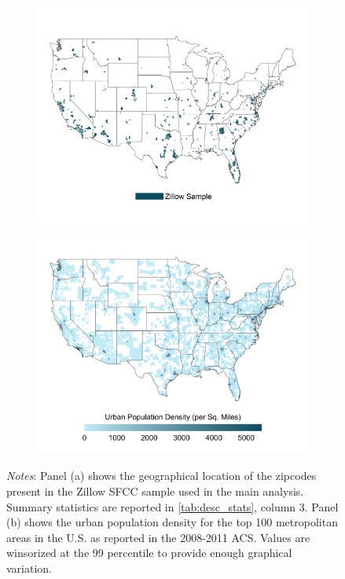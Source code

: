 \begin{figure}
	\caption{Comparison Between Zillow Sample and Population Density in CBSAs}
	\label{fig:maps}
	\begin{subfigure}[b]{\textwidth}\centering
		\includegraphics[width = .85\textwidth]{../../analysis/descriptive_maps/output/sample_map.png}
	\end{subfigure}
	\quad 
	\begin{subfigure}[b]{\textwidth}\centering
		\includegraphics[width = .85\textwidth]{../../analysis/descriptive_maps/output/popurban_density_map.png}
	\end{subfigure}
	\begin{minipage}{.95\textwidth} \footnotesize
	\vspace{2mm} 
	\textit{Notes}: Panel (a) shows the geographical location of the zipcodes present in the Zillow SFCC sample 
	used in the main analysis. Summary statistics are reported in \autoref{tab:desc_stats}, column 3. Panel (b) 
	shows the urban population density for the top 100 metropolitan areas in the U.S. as reported in the 2008-2011 
	ACS. Values are winsorized at the 99 percentile to provide enough graphical variation. 
\end{minipage}

\end{figure}

